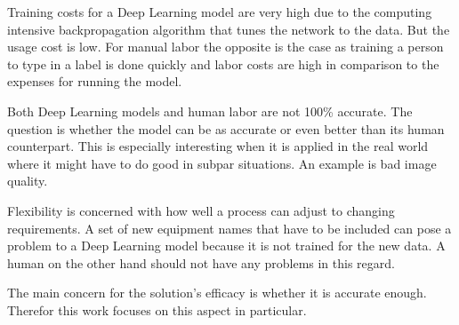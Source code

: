 Training costs for a Deep Learning model are very high due to the computing intensive
backpropagation algorithm that tunes the network to the data.
But the usage cost is low.
For manual labor the opposite is the case as training a person to type in a label is done quickly
and labor costs are high in comparison to the expenses for running the model.

Both Deep Learning models and human labor are not 100\% accurate.
The question is whether the model can be as accurate or even better than its human counterpart.
This is especially interesting when it is applied in the real world where it might have to do good
in subpar situations.
An example is bad image quality.

Flexibility is concerned with how well a process can adjust to changing requirements.
A set of new equipment names that have to be included can pose a problem to a Deep Learning model
because it is not trained for the new data.
A human on the other hand should not have any problems in this regard.

The main concern for the solution's efficacy is whether it is accurate enough.
Therefor this work focuses on this aspect in particular.
